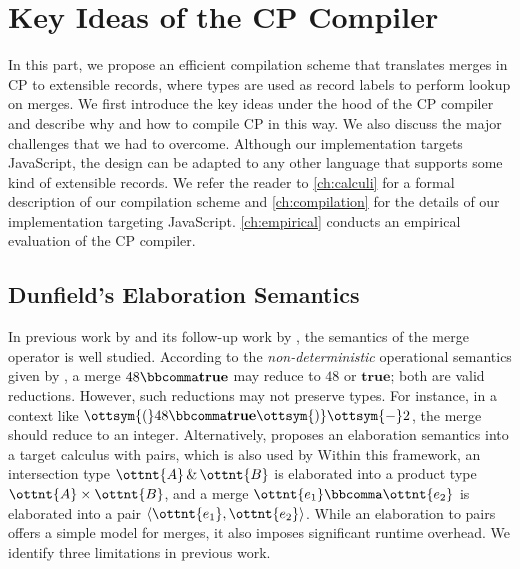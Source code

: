 \chapter{Key Ideas of the CP Compiler} \label{ch:key}

In this part, we propose an efficient compilation scheme that translates merges
in CP to extensible records, where types are used as record labels to perform
lookup on merges. We first introduce the key ideas under the hood of the CP
compiler and describe why and how to compile CP in this way. We also discuss the
major challenges that we had to overcome. Although our implementation targets
JavaScript, the design can be adapted to any other language that supports some
kind of extensible records. We refer the reader to \autoref{ch:calculi} for a
formal description of our compilation scheme and \autoref{ch:compilation} for
the details of our implementation targeting JavaScript. \autoref{ch:empirical}
conducts an empirical evaluation of the CP compiler.

\section{Dunfield's Elaboration Semantics} \label{sec:dunfield}

In previous work by \citet{dunfield2014elaborating} and its follow-up work by
\citet{oliveira2016disjoint}, the semantics of the merge operator is well
studied. According to the \emph{non-deterministic} operational semantics given
by \citeauthor{dunfield2014elaborating}, a merge $48  \bbcomma   \mathbf{true} $ may reduce to
$48$ or $ \mathbf{true} $; both are valid reductions. However, such reductions may
not preserve types. For instance, in a context like $\ottsym{(}  48  \bbcomma   \mathbf{true}   \ottsym{)}  \ottsym{-}  2$, the
merge should reduce to an integer. Alternatively,
\citeauthor{dunfield2014elaborating} proposes an elaboration semantics into a
target calculus with pairs, which is also used by
\citeauthor{oliveira2016disjoint} Within this framework, an intersection type
$\ottnt{A}  \, {\&} \,  \ottnt{B}$ is elaborated into a product type $ \ottnt{A}  \times  \ottnt{B} $, and a merge $\ottnt{e_{{\mathrm{1}}}}  \bbcomma  \ottnt{e_{{\mathrm{2}}}}$
is elaborated into a pair $ \langle  \ottnt{e_{{\mathrm{1}}}} ,  \ottnt{e_{{\mathrm{2}}}}  \rangle $. While an elaboration to pairs offers a
simple model for merges, it also imposes significant runtime overhead. We
identify three limitations in previous work. 

